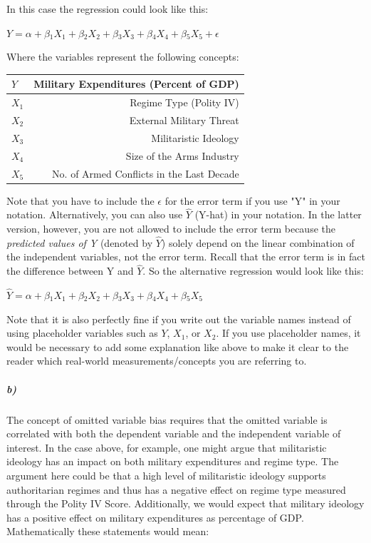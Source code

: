 \documentclass[12pt]{article}\usepackage[]{graphicx}\usepackage[]{color}
\begin{document}
In this case the regression could look like this:

$ Y = \alpha + \beta{_1}X_1 + \beta{_2}X_2 + \beta{_3}X_3 + \beta{_4}X_4 + \beta{_5}X_5 + \epsilon$

\bigskip

Where the variables represent the following concepts:

\begin{center}
  \begin{tabular}{ | l | r | }
    \hline
    $Y$ & Military Expenditures (Percent of GDP) \\ \hline
    $X_1$ & Regime Type (Polity IV) \\ \hline
    $X_2$ & External Military Threat \\ \hline
    $X_3$ & Militaristic Ideology \\ \hline
    $X_4$ & Size of the Arms Industry \\ \hline
    $X_5$ & No. of Armed Conflicts in the Last Decade\\
    \hline
  \end{tabular}
\end{center}

\bigskip

Note that you have to include the $\epsilon$ for the error term if you use "Y" in your notation. Alternatively, you can also use $\hat{Y}$ (Y-hat) in your notation. In the latter version, however, you are not allowed to include the error term because the \textit{predicted values of Y} (denoted by $\hat{Y}$) solely depend on the linear combination of the independent variables, not the error term. Recall that the error term is in fact the difference between Y and $\hat{Y}$. So the alternative regression would look like this:

$ \hat{Y} = \alpha + \beta{_1}X_1 + \beta{_2}X_2 + \beta{_3}X_3 + \beta{_4}X_4 + \beta{_5}X_5$

\bigskip

Note that it is also perfectly fine if you write out the variable names instead of using placeholder variables such as $Y$, $X_1$, or $X_2$. If you use placeholder names, it would be necessary to add some explanation like above to make it clear to the reader which real-world measurements/concepts you are referring to.



\subparagraph{b)} The concept of omitted variable bias requires that the omitted variable is correlated with both the dependent variable and the independent variable of interest. In the case above, for example, one might argue that militaristic ideology has an impact on both military expenditures and regime type. The argument here could be that a high level of militaristic ideology supports authoritarian regimes and thus has a negative effect on regime type measured through the Polity IV Score. Additionally, we would expect that military ideology has a positive effect on military expenditures as percentage of GDP. Mathematically these statements would mean:
\end{document}
